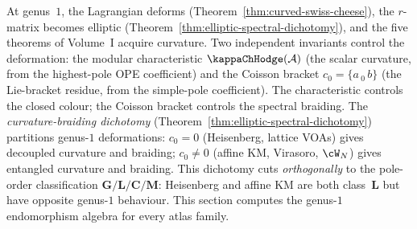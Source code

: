 At genus~$1$, the Lagrangian deforms
(Theorem~\ref{thm:curved-swiss-cheese}), the $r$-matrix
becomes elliptic
(Theorem~\ref{thm:elliptic-spectral-dichotomy}), and the
five theorems of Volume~I acquire curvature. Two
independent invariants control the deformation: the modular
characteristic $\kappaChHodge(\cA)$ (the scalar curvature, from the
highest-pole OPE coefficient) and the Coisson bracket
$c_0 = \{a \,{}_0\, b\}$ (the Lie-bracket residue, from the
simple-pole coefficient). The characteristic controls the
closed colour; the Coisson bracket controls the spectral
braiding. The \emph{curvature-braiding dichotomy}
(Theorem~\ref{thm:elliptic-spectral-dichotomy}) partitions
genus-$1$ deformations: $c_0 = 0$ (Heisenberg, lattice VOAs)
gives decoupled curvature and braiding; $c_0 \ne 0$ (affine KM,
Virasoro, $\cW_N$) gives entangled curvature and braiding.
This dichotomy cuts \emph{orthogonally} to the pole-order
classification $\mathbf{G}/\mathbf{L}/\mathbf{C}/\mathbf{M}$:
Heisenberg and affine KM are both class~$\mathbf{L}$ but have
opposite genus-$1$ behaviour. This section computes the genus-$1$
endomorphism algebra for every atlas family.


